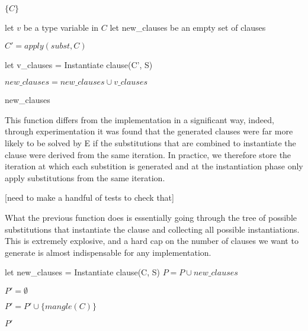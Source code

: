 \documentclass{article}
\begin{document}
\begin{algorithm}[tbh]
\begin{algorithmic}[1]


      \State \Return \(\{C\}\)

   \Else

      \State let \(v\) be a type variable in \(C\)
      \State let new\_clauses be an empty set of clauses



            \State \(C' = apply(subst, C)\)

            \State let v\_clauses = Instantiate clause(C', S)

         \EndIf

         \State \( new\_clauses = new\_clauses \cup v\_clauses\)

      \EndFor

      \State \Return new\_clauses
   \EndIf

\EndFunction
\end{algorithmic}
\end{algorithm}
This function differs from the implementation in a significant way, indeed, through experimentation it was found that the generated clauses were far more likely to be solved by E if the substitutions that are combined to instantiate the clause were derived from the same iteration. In practice, we therefore store the iteration at which each substition is generated and at the instantiation phase only apply substitutions from the same iteration.

[need to make a handful of tests to check that]

What the previous function does is essentially going through the tree of possible substitutions that instantiate the clause and collecting all possible instantiations. This is extremely explosive, and a hard cap on the number of clauses we want to generate is almost indispensable for any implementation.

\begin{algorithm}[tbh]
\begin{algorithmic}[1]

   \State let new\_clauses = Instantiate clause(C, S)
   \State \(P = P \cup new\_clauses\)
\EndFor

\State \(P' = \emptyset \)

      \State \(P' = P' \cup \{mangle(C)\}\)
   \EndIf
\EndFor

\State \Return \(P'\)

\EndFunction
\end{algorithmic}
\end{algorithm}
\end{document}
